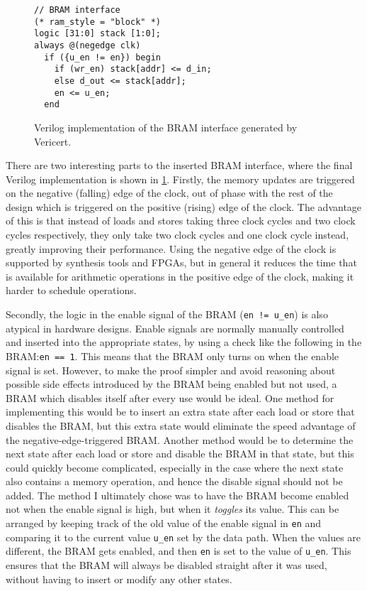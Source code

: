\begin{figure}
  \centering
  \begin{minipage}{6cm}
\begin{verbatim}
// BRAM interface
(* ram_style = "block" *)
logic [31:0] stack [1:0];
always @(negedge clk)
  if ({u_en != en}) begin
    if (wr_en) stack[addr] <= d_in;
    else d_out <= stack[addr];
    en <= u_en;
  end
\end{verbatim}
  \end{minipage}
  \caption{Verilog implementation of the BRAM interface generated by Vericert.}
  \label{fig:hg:bram-interface}
\end{figure}

There are two interesting parts to the inserted \gls{BRAM} interface, where the
final Verilog implementation is shown in \cref{fig:hg:bram-interface}.  Firstly,
the memory updates are triggered on the negative (falling) edge of the clock,
out of phase with the rest of the design which is triggered on the positive
(rising) edge of the clock.  The advantage of this is that instead of loads and
stores taking three clock cycles and two clock cycles respectively, they only
take two clock cycles and one clock cycle instead, greatly improving their
performance.  Using the negative edge of the clock is supported by synthesis
tools and FPGAs, but in general it reduces the time that is available for
arithmetic operations in the positive edge of the clock, making it harder to
schedule operations.

Secondly, the logic in the enable signal of the \gls{BRAM} (\texttt{en !=
  u\_en}) is also atypical in hardware designs.  Enable signals are normally
manually controlled and inserted into the appropriate states, by using a check
like the following in the \gls{BRAM}:\@ \texttt{en == 1}.  This means that the
\gls{BRAM} only turns on when the enable signal is set.  However, to make the
proof simpler and avoid reasoning about possible side effects introduced by the
\gls{BRAM} being enabled but not used, a \gls{BRAM} which disables itself after
every use would be ideal.  One method for implementing this would be to insert
an extra state after each load or store that disables the \gls{BRAM}, but this
extra state would eliminate the speed advantage of the negative-edge-triggered
\gls{BRAM}. Another method would be to determine the next state after each load
or store and disable the \gls{BRAM} in that state, but this could quickly become
complicated, especially in the case where the next state also contains a memory
operation, and hence the disable signal should not be added. The method I
ultimately chose was to have the \gls{BRAM} become enabled not when the enable
signal is high, but when it \emph{toggles} its value.  This can be arranged by
keeping track of the old value of the enable signal in \texttt{en} and comparing
it to the current value \texttt{u\_en} set by the data path.  When the values
are different, the \gls{BRAM} gets enabled, and then \texttt{en} is set to the
value of \texttt{u\_en}. This ensures that the \gls{BRAM} will always be
disabled straight after it was used, without having to insert or modify any
other states.

